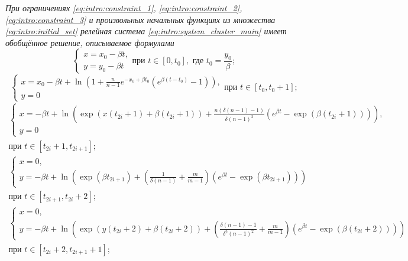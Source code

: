 	\textit{При ограничениях \eqref{eq:intro:constraint_1}, \eqref{eq:intro:constraint_2}, \eqref{eq:intro:constraint_3}  и произвольных начальных функциях из множества \eqref{eq:intro:initial_set} релейная система \eqref{eq:intro:system_cluster_main} имеет обобщённое решение, описываемое формулами}
	\small
	\begin{equation}
		\label{eq:intro:step1_solution}
		\begin{cases}
			x = x_0 - \beta t,\\
			y = y_0 - \beta t
		\end{cases}
		\text{при } t \in [0, t_0], \text{ где } t_0 = \dfrac{y_0}{\beta};
	\end{equation}
	\begin{equation}
		\label{eq:intro:step2_solution}
		\begin{cases}
			x = x_0 - \beta t + \ln\left(1 + \frac{n}{n - 1} e^{-x_0 + \beta t_0}  (e^{\beta  (t - t_0)} - 1)\right),\\
			y = 0
		\end{cases}
		\text{при } t \in [t_0, t_0 + 1];
	\end{equation}
	\begin{multline}
		\label{eq:intro:step3_solution}
		\begin{cases}
			x = -\beta t + \ln\left(\exp(x(t_{2i} + 1) + \beta (t_{2i} + 1)) + \frac{n (\delta(n - 1) - 1)}{\delta (n - 1)^2} (e^{\beta t} - \exp(\beta (t_{2i} + 1)))\right)
			,\\
			y = 0
		\end{cases}\\
		\text{при } t \in [t_{2i} + 1, t_{2i + 1}];
	\end{multline}
	\begin{multline}
		\label{eq:intro:step4_solution}
		\begin{cases}
			x = 0,\\
			y = -\beta t + \ln\left(\exp(\beta t_{2i + 1}) + \left(\frac{1}{\delta(n - 1)} + \frac{m}{m - 1}\right) (e^{\beta t} - \exp(\beta t_{2i + 1}))\right)
		\end{cases}\\
		\text{при } t \in [t_{2i + 1}, t_{2i} + 2];
	\end{multline}
	\begin{multline}
		\label{eq:intro:step5_solution}
		\begin{cases}
			x = 0,\\
			y = -\beta t + \ln\left(\exp(y(t_{2i} + 2) + \beta (t_{2i} + 2)) + \left(\frac{\delta(n - 1) - 1}{\delta^2 (n - 1)^2} + \frac{m}{m - 1}\right) (e^{\beta t} - \exp(\beta (t_{2i} + 2)))\right)
		\end{cases}\\
		\text{при } t \in [t_{2i} + 2, t_{2i + 1} + 1];
	\end{multline}
